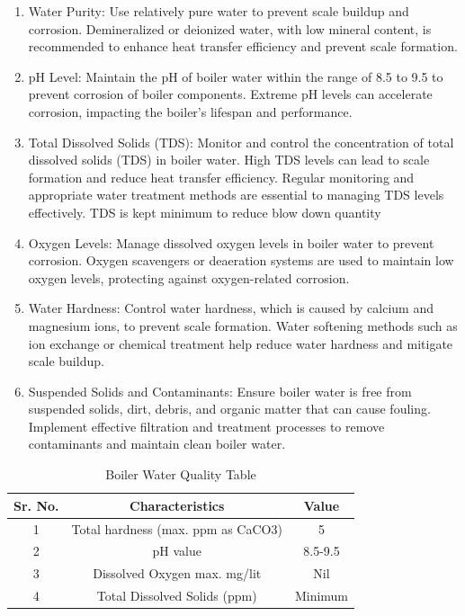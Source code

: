 \begin{enumerate}
\item Water Purity:
Use relatively pure water to prevent scale buildup and corrosion. Demineralized or deionized water, with low mineral content, is recommended to enhance heat transfer efficiency and prevent scale formation.
\item pH Level:
Maintain the pH of boiler water within the range of 8.5 to 9.5 to prevent corrosion of boiler components. Extreme pH levels can accelerate corrosion, impacting the boiler's lifespan and performance.
\item Total Dissolved Solids (TDS):
Monitor and control the concentration of total dissolved solids (TDS) in boiler water. High TDS levels can lead to scale formation and reduce heat transfer efficiency. Regular monitoring and appropriate water treatment methods are essential to managing TDS levels effectively. TDS is kept minimum to reduce blow down quantity
\item Oxygen Levels:
Manage dissolved oxygen levels in boiler water to prevent corrosion. Oxygen scavengers or deaeration systems are used to maintain low oxygen levels, protecting against oxygen-related corrosion.
\item Water Hardness:
Control water hardness, which is caused by calcium and magnesium ions, to prevent scale formation. Water softening methods such as ion exchange or chemical treatment help reduce water hardness and mitigate scale buildup.
\item Suspended Solids and Contaminants:
Ensure boiler water is free from suspended solids, dirt, debris, and organic matter that can cause fouling. Implement effective filtration and treatment processes to remove contaminants and maintain clean boiler water.
\end{enumerate}

\begin{table}[h]
\centering
\begin{tabular}{|c|c|c|}
\hline
\textbf{Sr. No.} & \textbf{Characteristics} & \textbf{Value} \\
\hline
1 & Total hardness (max. ppm as CaCO3) & 5 \\
\hline
2 & pH value & 8.5-9.5 \\
\hline
3 & Dissolved Oxygen max. mg/lit & Nil \\
\hline
4 & Total Dissolved Solids (ppm) & Minimum \\
\hline
\end{tabular}
\caption{Boiler Water Quality Table}
\label{tab:boiler-water-quality}
\end{table}

